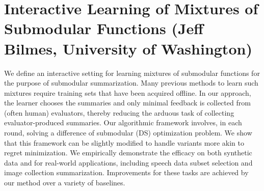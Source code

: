 \section{Interactive Learning of Mixtures of Submodular Functions
(Jeff Bilmes, University of Washington)}

We define an interactive setting for learning mixtures of submodular functions for the purpose of submodular summarization.  Many previous methods to learn such mixtures require training sets that have been acquired offline. In our approach, the learner chooses the summaries and only minimal feedback is collected from (often human) evaluators, thereby reducing the arduous task of collecting evaluator-produced summaries.  Our algorithmic framework involves, in each round, solving a difference of submodular (DS) optimization problem. We show that this framework can be slightly modified to handle variants more akin to regret minimization. We empirically demonstrate the efficacy on both synthetic data and for real-world applications, including speech data subset selection and image collection summarization. Improvements for these tasks are achieved by our method over a variety of baselines.